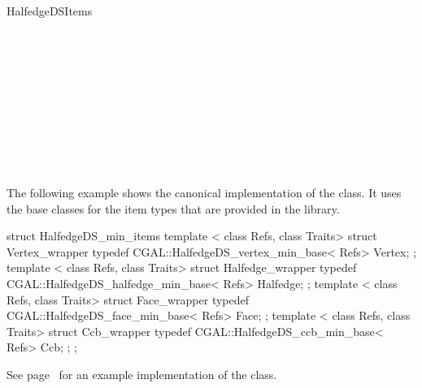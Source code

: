 \begin{ccRefConcept}{HalfedgeDSItems}
\ccSeeAlso

\\
\\
\\
\\
\\
\\
\\
\\
\\

\ccExample

The following example shows the canonical implementation of the
 class. It uses the base classes for the
item types that are provided in the library.

\begin{ccExampleCode}
struct HalfedgeDS_min_items {
    template < class Refs, class Traits>
    struct Vertex_wrapper {
        typedef CGAL::HalfedgeDS_vertex_min_base< Refs>   Vertex;
    };
    template < class Refs, class Traits>
    struct Halfedge_wrapper {
        typedef CGAL::HalfedgeDS_halfedge_min_base< Refs> Halfedge;
    };
    template < class Refs, class Traits>
    struct Face_wrapper {
        typedef CGAL::HalfedgeDS_face_min_base< Refs>     Face;
    };
    template < class Refs, class Traits>
    struct Ccb_wrapper {
        typedef CGAL::HalfedgeDS_ccb_min_base< Refs>     Ccb;
    };
};
\end{ccExampleCode}

See page~\pageref{pageHalfedgeDSitemsRef} for an example implementation 
of the  class.

\end{ccRefConcept}

\ccRefPageEnd

